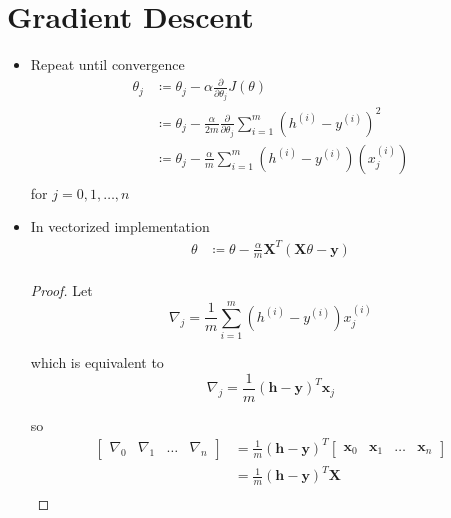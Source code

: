 \section{Gradient Descent}
\begin{itemize} 

    \item Repeat until convergence
    \begin{equation}
        \begin{split}
            \theta_j& \coloneqq \theta_j - \alpha \frac{\partial}{\partial\theta_j}J\left(\theta\right)\\
                    & \coloneqq \theta_j - \frac{\alpha}{2m} \frac{\partial}{\partial\theta_j} \sum_{i=1}^{m}\left( h^{(i)} - y^{(i)} \right)^2\\
                    & \coloneqq \theta_j - \frac{\alpha}{m} \sum_{i=1}^{m}\left( h^{(i)} - y^{(i)} \right)\left(x_j^{(i)}\right)\\
        \end{split}
    \end{equation}
    for $j=0,1,\dots,n$

    \item In vectorized implementation
    \begin{equation}
        \begin{split}
            \theta & \coloneqq \theta - \frac{\alpha}{m}\mathbf{X}^T\left(\mathbf{X}\theta-\mathbf{y}\right)\\
        \end{split}
    \end{equation}

    \begin{proof}
        Let 
        \begin{equation}
            \nabla_j = \frac{1}{m}\sum_{i=1}^{m}(h^{(i)}-y^{(i)})x_j^{(i)}
        \end{equation}
        
        which is equivalent to
        \begin{equation}
            \nabla_j = \frac{1}{m}(\mathbf{h}-\mathbf{y})^T\mathbf{x}_j
        \end{equation}

        so
        \begin{equation}
            \begin{split}
                \left[ \begin{matrix} \nabla_0 & \nabla_1 & \dots & \nabla_n \end{matrix} \right] &= \frac{1}{m}(\mathbf{h}-\mathbf{y})^T \left[ \begin{matrix} \mathbf{x}_0 & \mathbf{x}_1 & \dots & \mathbf{x}_n \end{matrix} \right]\\
                                                                                                    &= \frac{1}{m}(\mathbf{h}-\mathbf{y})^T \mathbf{X} \\
            \end{split}
        \end{equation}


\end{proof}
\end{itemize}
